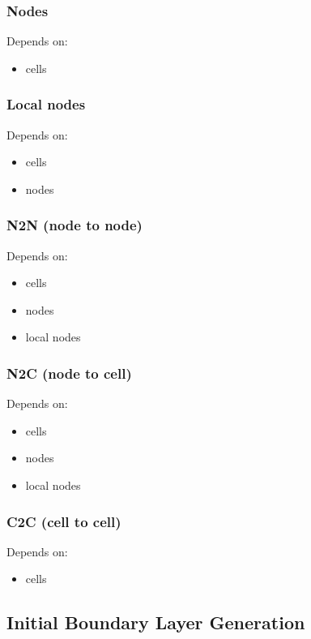 \documentclass[10pt,a4paper,british]{book}
\begin{document}
\subsubsection{Nodes}
Depends on:
\begin{itemize}
 \item cells
\end{itemize}

\subsubsection{Local nodes}
Depends on:
\begin{itemize}
 \item cells
 \item nodes
\end{itemize}

\subsubsection{N2N (node to node)}
Depends on:
\begin{itemize}
 \item cells
 \item nodes
 \item local nodes
\end{itemize}

\subsubsection{N2C (node to cell)}
Depends on:
\begin{itemize}
 \item cells
 \item nodes
 \item local nodes
\end{itemize}

\subsubsection{C2C (cell to cell)}
Depends on:
\begin{itemize}
 \item cells
\end{itemize}



\subsection{Initial Boundary Layer Generation}
\end{document}
